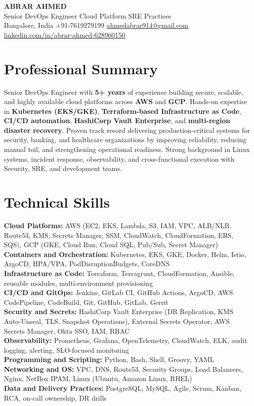 \documentclass[a4paper,10pt]{article}
\begin{document}
\begin{center}
    {\LARGE \textbf{ABRAR AHMED}}\\[2pt]
    {\normalsize Senior DevOps Engineer \textbar{} Cloud Platform \textbar{} SRE Practices}\\[2pt]
    Bangalore, India \textbar{} +91-7619279199 \textbar{}
    \href{mailto:ahmedabrar914@gmail.com}{ahmedabrar914@gmail.com} \textbar{}
    \href{https://linkedin.com/in/abrar-ahmed-628960150}{linkedin.com/in/abrar-ahmed-628960150}
\end{center}

\section*{Professional Summary}
Senior DevOps Engineer with \textbf{5+ years} of experience building secure, scalable, and highly available cloud platforms across \textbf{AWS} and \textbf{GCP}. Hands-on expertise in \textbf{Kubernetes (EKS/GKE)}, \textbf{Terraform-based Infrastructure as Code}, \textbf{CI/CD automation}, \textbf{HashiCorp Vault Enterprise}, and \textbf{multi-region disaster recovery}. Proven track record delivering production-critical systems for security, banking, and healthcare organizations by improving reliability, reducing manual toil, and strengthening operational readiness. Strong background in Linux systems, incident response, observability, and cross-functional execution with Security, SRE, and development teams.

\section*{Technical Skills}
\textbf{Cloud Platforms:} AWS (EC2, EKS, Lambda, S3, IAM, VPC, ALB/NLB, Route53, KMS, Secrets Manager, SSM, CloudWatch, CloudFormation, EBS, SQS), GCP (GKE, Cloud Run, Cloud SQL, Pub/Sub, Secret Manager)\\
\textbf{Containers and Orchestration:} Kubernetes, EKS, GKE, Docker, Helm, Istio, ArgoCD, HPA/VPA, PodDisruptionBudgets, CoreDNS\\
\textbf{Infrastructure as Code:} Terraform, Terragrunt, CloudFormation, Ansible, reusable modules, multi-environment provisioning\\
\textbf{CI/CD and GitOps:} Jenkins, GitLab CI, GitHub Actions, ArgoCD, AWS CodePipeline, CodeBuild, Git, GitHub, GitLab, Gerrit\\
\textbf{Security and Secrets:} HashiCorp Vault Enterprise (DR Replication, KMS Auto-Unseal, TLS, Snapshot Operations), External Secrets Operator, AWS Secrets Manager, Okta SSO, IAM, RBAC\\
\textbf{Observability:} Prometheus, Grafana, OpenTelemetry, CloudWatch, ELK, audit logging, alerting, SLO-focused monitoring\\
\textbf{Programming and Scripting:} Python, Bash, Shell, Groovy, YAML\\
\textbf{Networking and OS:} VPC, DNS, Route53, Security Groups, Load Balancers, Nginx, NetBox IPAM, Linux (Ubuntu, Amazon Linux, RHEL)\\
\textbf{Data and Delivery Practices:} PostgreSQL, MySQL, Agile, Scrum, Kanban, RCA, on-call ownership, DR drills
\end{document}
